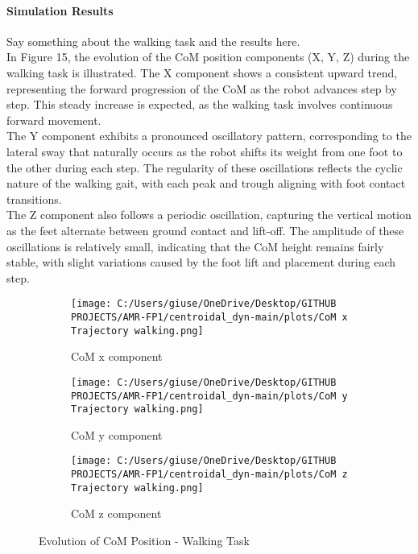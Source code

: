\documentclass[main.tex]{subfiles}
\begin{document}
\paragraph{Simulation Results}
Say something about the walking task and the results here. \\ 
In Figure 15, the evolution of the CoM position components (X, Y, Z) during the walking task is illustrated. The X component shows a consistent upward trend, representing the forward progression of the CoM as the robot advances step by step. This steady increase is expected, as the walking task involves continuous forward movement. \\
The Y component exhibits a pronounced oscillatory pattern, corresponding to the lateral sway that naturally occurs as the robot shifts its weight from one foot to the other during each step. The regularity of these oscillations reflects the cyclic nature of the walking gait, with each peak and trough aligning with foot contact transitions. \\
The Z component also follows a periodic oscillation, capturing the vertical motion as the feet alternate between ground contact and lift-off. The amplitude of these oscillations is relatively small, indicating that the CoM height remains fairly stable, with slight variations caused by the foot lift and placement during each step.
\begin{figure}[H]
    \centering
    \begin{subfigure}[b]{0.32\textwidth}
        \centering
        \texttt{[image: C:/Users/giuse/OneDrive/Desktop/GITHUB PROJECTS/AMR-FP1/centroidal\_dyn-main/plots/CoM x Trajectory walking.png]}
        \caption{CoM x component}
        \label{fig:sub1}
    \end{subfigure}
    \hfill
    \begin{subfigure}[b]{0.32\textwidth}
        \centering
        \texttt{[image: C:/Users/giuse/OneDrive/Desktop/GITHUB PROJECTS/AMR-FP1/centroidal\_dyn-main/plots/CoM y Trajectory walking.png]}
        \caption{CoM y component}
        \label{fig:sub2}
    \end{subfigure}
    \hfill
    \begin{subfigure}[b]{0.32\textwidth}
        \centering
        \texttt{[image: C:/Users/giuse/OneDrive/Desktop/GITHUB PROJECTS/AMR-FP1/centroidal\_dyn-main/plots/CoM z Trajectory walking.png]}
        \caption{CoM z component}
        \label{fig:sub3}
    \end{subfigure}
    \caption{Evolution of CoM Position - Walking Task}
    \label{fig:threeimages}
\end{figure}
\end{document}
